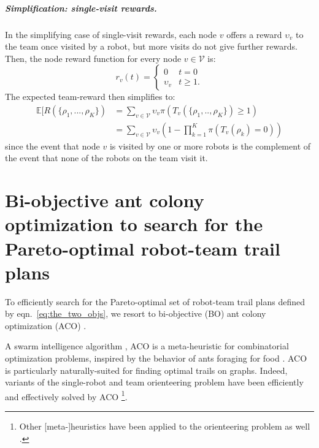 \documentclass[11pt, oneside]{article}
\begin{document}
\vspace{-\baselineskip}
\subparagraph{Simplification: single-visit rewards.}
In the simplifying case of single-visit rewards, each node $v$ offers a reward $\upsilon_v$ to the team once visited by a robot, but more visits do not give further rewards. Then, the node reward function for every node $v\in\mathcal{V}$ is:
\begin{equation}
	r_v(t) = \begin{cases}
		0 & t = 0 \\
		\upsilon_v & t \geq 1.
	\end{cases}
\end{equation}The expected team-reward then simplifies to:
\begin{align}
	\mathbb{E}[R(\{\rho_1, ..., \rho_K\}) & = \sum_{v \in \mathcal{V} } \upsilon_v \pi(T_v(\{\rho_1, .., \rho_K\}) \geq 1) \\
		      & = \sum_{v \in \mathcal{V} } \upsilon_v \left(1 - \prod_{k=1}^K  \pi(T_v(\rho_k) =0) \right) 
\end{align} since the event that node $v$ is visited by one or more robots is the complement of the event that none of the robots on the team visit it.



\section{Bi-objective ant colony optimization to search for the Pareto-optimal robot-team trail plans}
To efficiently search for the Pareto-optimal set of robot-team trail plans defined by eqn.~\ref{eq:the_two_objs}, we resort to bi-objective (BO) ant colony optimization (ACO) \cite{iredi2001bi}. 

A swarm intelligence algorithm \cite{bonabeau1999swarm}, ACO \cite{dorigo2006ant,bonabeau1999swarm} is a meta-heuristic for combinatorial optimization problems, inspired by the behavior of ants foraging for food \cite{bonabeau2000inspiration}. ACO is particularly naturally-suited for finding optimal trails on graphs.
Indeed, variants of the single-robot and team orienteering problem have been efficiently and effectively solved by ACO \cite{ke2008ants,chen2015multiobjective,verbeeck2017time,sohrabi2021acs,chen2022environment}\footnote{Other [meta-]heuristics have been applied to the orienteering problem as well \cite{gavalas2014survey,dang2013effective,chao1996fast,butt1994heuristic}.}.
\end{document}
